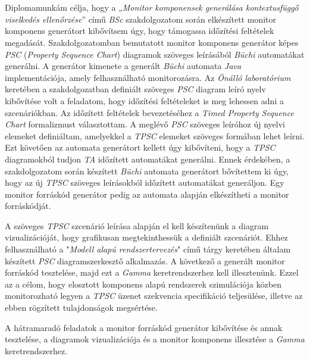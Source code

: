 \chapter{\bevezetes}
Diplomamunkám célja, hogy a „\textit{Monitor komponensek generálása kontextusfüggő viselkedés ellenőrzése}” \cite{Bakai} című \textit{BSc} szakdolgozatom során elkészített monitor komponens generátort kibővítsem úgy, hogy támogassa időzítési feltételek megadását.
Szakdolgozatomban bemutatott monitor komponens generátor képes \textit{PSC} (\textit{Property Sequence Chart}) \cite{PSC1} diagramok szöveges leírásából \textit{Büchi} \cite{PSC1} automatákat generálni.
A generátor kimenete a generált \textit{Büchi} automata \textit{Java} implementációja, amely felhasználható monitorozásra.
Az \textit{Önálló laboratórium} keretében a szakdolgozatban definiált szöveges \textit{PSC} diagram leíró nyelv kibővítése volt a feladatom, hogy időzítési feltételeket is meg lehessen adni a szcenáriókban.
Az időzített feltételek bevezetéséhez a \textit{Timed Property Sequence Chart} \cite{TPSC1} formalizmust választottam.
A meglévő \textit{PSC} szöveges leíróhoz új nyelvi elemeket definiáltam, amelyekkel a \textit{TPSC} elemeket szöveges formában lehet leírni.
Ezt követően az automata generátort kellett úgy kibővíteni, hogy a \textit{TPSC} diagramokból tudjon \textit{TA} időzített automatákat \cite{TPSC1} generálni.
Ennek érdekében, a szakdolgozatom során készített \textit{Büchi} automata generátort bővítettem ki úgy, hogy az új \textit{TPSC} szöveges leírásokból időzített automatákat generáljon.
Egy monitor forráskód generátor pedig az automata alapján elkészítheti a monitor forráskódját.

A szöveges \textit{TPSC} szcenárió leírása alapján el kell készítenünk a diagram vizualizációját, hogy grafikusan megtekinthessük a definiált szcenáriót.
Ehhez felhasználható a "\textit{Modell alapú rendszertervezés}" című tárgy keretében általam készített \textit{PSC} diagramszerkesztő alkalmazás.
A következő a generált monitor forráskód tesztelése, majd ezt a \textit{Gamma} keretrendszerhez \cite{Gamma} kell illesztenünk.
Ezzel az a célom, hogy elosztott komponens alapú rendszerek szimulációja közben monitorozható legyen a \textit{TPSC} üzenet szekvencia specifikáció teljesülése, illetve az ebben rögzített tulajdonságok megsértése.

A hátramaradó feladatok a monitor forráskód generátor kibővítése és annak tesztelése, a diagramok vizualizációja és a monitor komponens illesztése a \textit{Gamma} keretrendszerhez.

